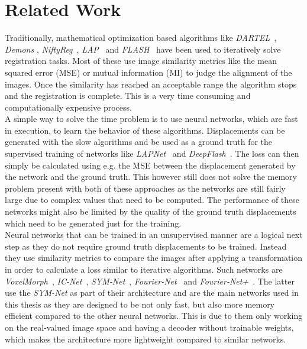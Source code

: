 \section{Related Work} \label{Sec:RelatedWork}
Traditionally, mathematical optimization based algorithms like \emph{DARTEL}~\cite{DARTEL}, \emph{Demons} \cite{Vercauteren2009}, \emph{NiftyReg}~\cite{NiftiReg}, \emph{LAP}~\cite{LAP} and \emph{FLASH}~\cite{FLASH} have been used to iteratively solve registration tasks. Most of these use image similarity metrics like the mean squared error (MSE) or mutual information (MI) to judge the alignment of the images. Once the similarity has reached an acceptable range the algorithm stops and the registration is complete. This is a very time consuming and computationally expensive process.\\
A simple way to solve the time problem is to use neural networks, which are fast in execution, to learn the behavior of these algorithms. Displacements can be generated with the slow algorithms and be used as a ground truth for the supervised training of networks like \emph{LAPNet}~\cite{LAPNet} and \emph{DeepFlash}~\cite{DeepFlash}. The loss can then simply be calculated using e.g. the MSE between the displacement generated by the network and the ground truth. This however still does not solve the memory problem present with both of these approaches as the networks are still fairly large due to complex values that need to be computed. The performance of these networks might also be limited by the quality of the ground truth displacements which need to be generated just for the training.\\
Neural networks that can be trained in an unsupervised manner are a logical next step as they do not require ground truth displacements to be trained. Instead they use similarity metrics to compare the images after applying a transformation in order to calculate a loss similar to iterative algorithms. Such networks are \emph{VoxelMorph}~\cite{Voxelmorph}, \emph{IC-Net}~\cite{IC-Net}, \emph{SYM-Net}~\cite{SYM-Net}, \emph{Fourier-Net}~\cite{Fourier-Net} and \emph{Fourier-Net+}~\cite{Fourier-Net+}. The latter use the \emph{SYM-Net} as part of their architecture and are the main networks used in this thesis as they are designed to be not only fast, but also more memory efficient compared to the other neural networks. This is due to them only working on the real-valued image space and having a decoder without trainable weights, which makes the architecture more lightweight compared to similar networks.\\
